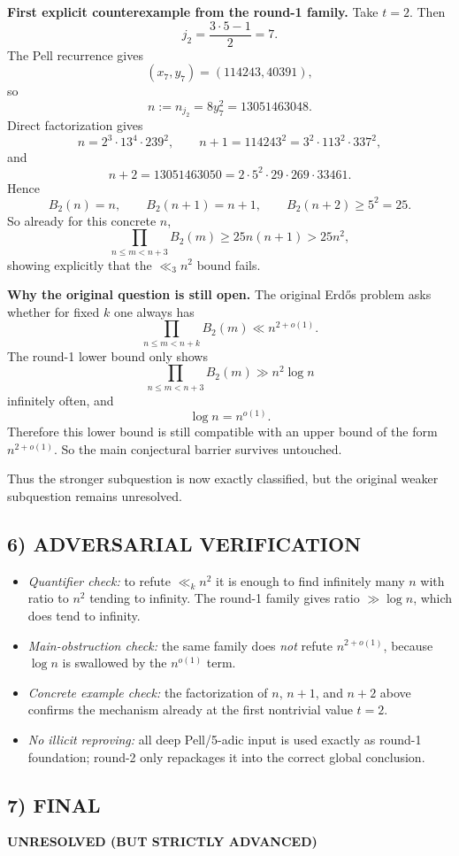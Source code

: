 \medskip
\textbf{First explicit counterexample from the round-1 family.}
Take $t=2$. Then
\[
j_2=\frac{3\cdot 5-1}{2}=7.
\]
The Pell recurrence gives
\[
(x_7,y_7)=(114243,40391),
\]
so
\[
n:=n_{j_2}=8y_7^2=13051463048.
\]
Direct factorization gives
\[
n=2^3\cdot 13^4\cdot 239^2,
\qquad
n+1=114243^2=3^2\cdot 113^2\cdot 337^2,
\]
and
\[
n+2=13051463050=2\cdot 5^2\cdot 29\cdot 269\cdot 33461.
\]
Hence
\[
B_2(n)=n,
\qquad
B_2(n+1)=n+1,
\qquad
B_2(n+2)\ge 5^2=25.
\]
So already for this concrete $n$,
\[
\prod_{n\le m<n+3} B_2(m) \ge 25n(n+1) > 25n^2,
\]
showing explicitly that the $\ll_3 n^2$ bound fails.

\medskip
\textbf{Why the original question is still open.}
The original Erd\H{o}s problem asks whether for fixed $k$ one always has
\[
\prod_{n\le m<n+k} B_2(m) \ll n^{2+o(1)}.
\]
The round-1 lower bound only shows
\[
\prod_{n\le m<n+3} B_2(m) \gg n^2\log n
\]
infinitely often, and
\[
\log n=n^{o(1)}.
\]
Therefore this lower bound is still compatible with an upper bound of the form $n^{2+o(1)}$. So the main conjectural barrier survives untouched.

Thus the stronger subquestion is now exactly classified, but the original weaker subquestion remains unresolved.

\subsection*{6) ADVERSARIAL VERIFICATION}
\begin{itemize}
\item \emph{Quantifier check:} to refute $\ll_k n^2$ it is enough to find infinitely many $n$ with ratio to $n^2$ tending to infinity. The round-1 family gives ratio $\gg \log n$, which does tend to infinity.
\item \emph{Main-obstruction check:} the same family does \emph{not} refute $n^{2+o(1)}$, because $\log n$ is swallowed by the $n^{o(1)}$ term.
\item \emph{Concrete example check:} the factorization of $n$, $n+1$, and $n+2$ above confirms the mechanism already at the first nontrivial value $t=2$.
\item \emph{No illicit reproving:} all deep Pell/5-adic input is used exactly as round-1 foundation; round-2 only repackages it into the correct global conclusion.
\end{itemize}

\subsection*{7) FINAL}
\textbf{UNRESOLVED (BUT STRICTLY ADVANCED)}

